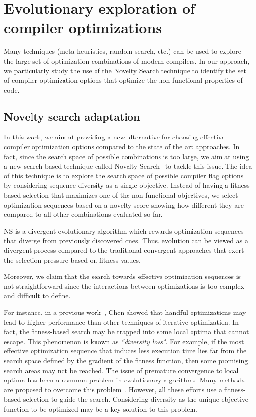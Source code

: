 \section{Evolutionary exploration of compiler optimizations}
\label{sec:comp-NS}
Many techniques (meta-heuristics, random search, etc.) can be used to explore the large set of optimization combinations of modern compilers. 
In our approach, we particularly study the use of the Novelty Search technique to identify the set of compiler optimization options that optimize the non-functional properties of code.

\subsection{Novelty search adaptation}

In this work, we aim at providing a new alternative for choosing effective compiler optimization options compared to the state of the art approaches. 
In fact, since the search space of possible combinations is too large, we aim at using a new search-based technique called Novelty Search~\cite{lehman2008exploiting} to tackle this issue. 
The idea of this technique is to explore the search space of possible compiler flag options by considering sequence diversity as a single objective. 
Instead of having a fitness-based selection that maximizes one of the non-functional objectives, we select optimization sequences based on a novelty score showing how different they are compared to all other combinations evaluated so far. 

NS is a divergent evolutionary algorithm which rewards optimization sequences that diverge from previously discovered ones. Thus, evolution can be viewed as a divergent process compared to the traditional convergent approaches that exert the selection pressure based on fitness values.

Moreover, we claim that the search towards effective optimization sequences is not straightforward since the interactions between optimizations is too complex and difficult to define. 

For instance, in a previous work~\cite{chen2012deconstructing}, Chen \etal showed that handful optimizations may lead to higher performance than other techniques of iterative optimization. 
In fact, the fitness-based search may be trapped into some local optima that cannot escape\cite{bodin1998iterative}. 
This phenomenon is known as \textit{``diversity loss"}. For example, if the most effective optimization sequence that induces less execution time lies far from the search space defined by the gradient of the fitness function, then some promising search areas may not be reached. 
The issue of premature convergence to local optima has been a common problem in evolutionary algorithms. 
Many methods are proposed to overcome this problem~\cite{banzhaf1996effect}. 
However, all these efforts use a fitness-based selection to guide the search. Considering diversity as the unique objective function to be optimized may be a key solution to this problem.

